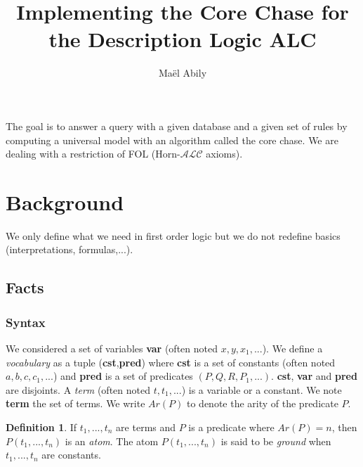\documentclass{article}
\title{Implementing the Core Chase for the Description Logic ALC}
\author{Maël Abily}	%
\theoremstyle{definition}
\newtheorem{definition}{Definition}[section]
\theoremstyle{remark}
\begin{document}
\maketitle						%



\begin{comment}
I modified: definition of atom, the first remark, definition 2 and 3 (including the definition of core),exemple of core, proof of proposition 1.2, the def of $Tr_{T}(F)$, the last exemple and the def of universal model.
\end{comment}

The goal is to answer a query with a given database and a given set of rules by computing a universal model with an algorithm called the core chase. We are dealing with a restriction of FOL (Horn-$\mathcal{ALC}$ axioms).

\tableofcontents					%
\section{Background}

We only define what we need in first order logic but we do not redefine basics (interpretations, formulas,...).

\subsection{Facts}

\subsubsection{Syntax}

We considered a set of variables \textbf{var} (often noted $x,y,x_{1},...$). We define a \emph{vocabulary} as a tuple (\textbf{cst},\textbf{pred}) where \textbf{cst} is a set of constants (often noted $a,b,c,c_{1},...$) and \textbf{pred} is a set of predicates $(P,Q,R,P_{1},...)$. \textbf{cst}, \textbf{var} and \textbf{pred} are disjoints. A \emph{term}  (often noted $t,t_{1},...$) is a variable or a constant. We note \textbf{term} the set of terms. We write \emph{$\textit{Ar}(P)$} to denote the arity of the predicate $P$. 

\begin{definition}
If $t_1,...,t_n$ are terms and $P$ is a predicate where $Ar(P) = n$, then $P(t_{1},...,t_{n})$ is an \emph{atom}. The atom $P(t_{1},...,t_{n})$ is said to be \emph{ground} when $t_1,...,t_n$ are constants. 
\end{definition}
\end{document}
